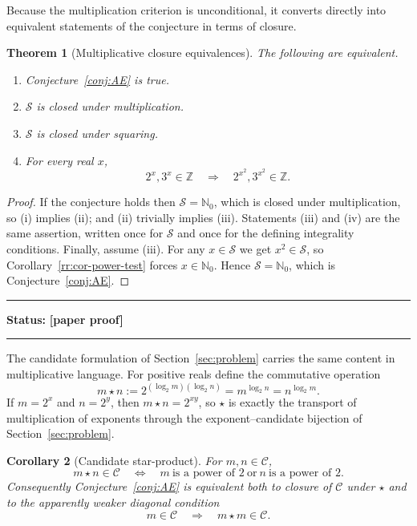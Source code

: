\documentclass[11pt,oneside]{article}
\newtheorem{theorem}{Theorem}[section]
\newtheorem{corollary}[theorem]{Corollary}
\theoremstyle{definition}
\theoremstyle{remark}
\newcommand{\Nzero}{\mathbb N_0}
\newcommand{\Z}{\mathbb Z}
\newcommand{\Sol}{\mathcal S}
\newcommand{\Cand}{\mathcal C}
\newcommand{\statusnew}{\textcolor{newgreen}{\textbf{[paper proof]}}}
\newenvironment{statusbox}[1]
{\begin{center}\begin{minipage}{0.94\textwidth}\raggedright\hbadness=10000\hrule
\vspace{0.45em}\textbf{Status:} #1\par\vspace{0.35em}}
{\vspace{0.35em}\hrule\end{minipage}\end{center}}
\begin{document}
Because the multiplication criterion is unconditional, it converts directly into equivalent
statements of the conjecture in terms of closure.

\begin{theorem}[Multiplicative closure equivalences]
\label{rr:thm-closure-equiv}
The following are equivalent.
\begin{enumerate}[label=\textup{(\roman*)}]
\item Conjecture~\ref{conj:AE} is true.
\item $\Sol$ is closed under multiplication.
\item $\Sol$ is closed under squaring.
\item For every real $x$,
\[
 2^x,3^x\in\Z
 \quad\Longrightarrow\quad
 2^{x^2},3^{x^2}\in\Z .
\]
\end{enumerate}
\end{theorem}

\begin{proof}
If the conjecture holds then $\Sol=\Nzero$, which is closed under multiplication, so
(i) implies (ii); and (ii) trivially implies (iii).  Statements (iii) and (iv) are the same
assertion, written once for $\Sol$ and once for the defining integrality conditions.
Finally, assume (iii).  For any $x\in\Sol$ we get $x^2\in\Sol$, so
Corollary~\ref{rr:cor-power-test} forces $x\in\Nzero$.  Hence $\Sol=\Nzero$, which is
Conjecture~\ref{conj:AE}.
\end{proof}

\begin{statusbox}{\statusnew}
\end{statusbox}

The candidate formulation of Section~\ref{sec:problem} carries the same content in
multiplicative language.  For positive reals define the commutative operation
\begin{equation}
 m\star n
 :=2^{(\log_2m)(\log_2n)}
 =m^{\log_2n}
 =n^{\log_2m} .
 \label{rr:eq-star}
\end{equation}
If $m=2^x$ and $n=2^y$, then $m\star n=2^{xy}$, so $\star$ is exactly the transport of
multiplication of exponents through the exponent--candidate bijection of
Section~\ref{sec:problem}.

\begin{corollary}[Candidate star-product]
\label{rr:cor-star}
For $m,n\in\Cand$,
\[
 m\star n\in\Cand
 \quad\Longleftrightarrow\quad
 m\ \text{is a power of }2
 \ \text{or}\
 n\ \text{is a power of }2 .
\]
Consequently Conjecture~\ref{conj:AE} is equivalent both to closure of $\Cand$ under $\star$
and to the apparently weaker diagonal condition
\[
 m\in\Cand
 \quad\Longrightarrow\quad
 m\star m\in\Cand .
\]
\end{corollary}
\end{document}
